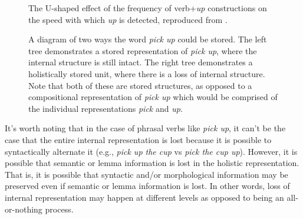 \documentclass[
  authoryear,
  preprint,
  1p,
  onecolumn]{elsarticle}
\begin{document}
\begin{figure}


\caption{\label{fig-kapatsinskiplot}The U-shaped effect of the frequency
of verb+\emph{up} constructions on the speed with which \emph{up} is
detected, reproduced from \citet{kapatsinski2009}.}

\end{figure}%

\begin{figure}


\caption{\label{fig-lossinternalstructure}A diagram of two ways the word
\emph{pick up} could be stored. The left tree demonstrates a stored
representation of \emph{pick up}, where the internal structure is still
intact. The right tree demonstrates a holistically stored unit, where
there is a loss of internal structure. Note that both of these are
stored structures, as opposed to a compositional representation of
\emph{pick up} which would be comprised of the individual
representations \emph{pick} and \emph{up}.}

\end{figure}%

It's worth noting that in the case of phrasal verbs like \emph{pick up},
it can't be the case that the entire internal representation is lost
because it is possible to syntactically alternate it (e.g., \emph{pick
up the cup} vs \emph{pick the cup up}). However, it is possible that
semantic or lemma information is lost in the holistic representation.
That is, it is possible that syntactic and/or morphological information
may be preserved even if semantic or lemma information is lost. In other
words, loss of internal representation may happen at different levels as
opposed to being an all-or-nothing process.
\end{document}
